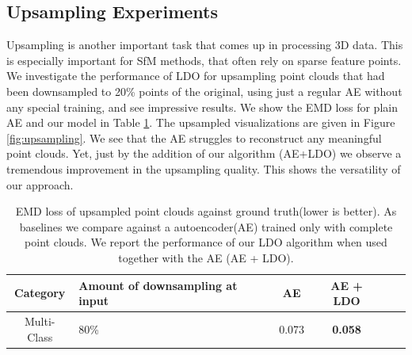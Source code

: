 \documentclass[10pt,twocolumn,letterpaper]{article}
\begin{document}
\subsection{Upsampling Experiments}
Upsampling is another important task that comes up in processing 3D data. This is especially important for SfM methods, that often rely on sparse feature points. We investigate the performance of LDO for upsampling point clouds that had been downsampled to 20\% points of the original, using just a regular AE without any special training, and see impressive results. We show the EMD loss for plain AE and our model in Table \ref{tab:upsample}. The upsampled visualizations are given in Figure \ref{fig:upsampling}. We see that the AE struggles to reconstruct any meaningful point clouds. Yet, just by the addition of our algorithm (AE+LDO) we observe a tremendous improvement in the upsampling quality. This shows the versatility of our approach.
\begin{table}
\begin{center}
\begin{tabular}{ |c|p{2.5cm}|c|c|c|c|} 
 \hline
Category & Amount of downsampling at input  & AE & AE + LDO \\
\hline
Multi-Class & 80\% & 0.073 & \textbf{0.058} \\
\hline
\end{tabular}
\end{center}
\caption {EMD loss of upsampled point clouds against ground truth(lower is better). As baselines we compare against a autoencoder(AE) trained only with complete point clouds. We report the performance of our LDO algorithm when used together with the AE (AE + LDO).} \label{tab:upsample}
\vspace{-15pt}
\end{table} 

\end{document}
